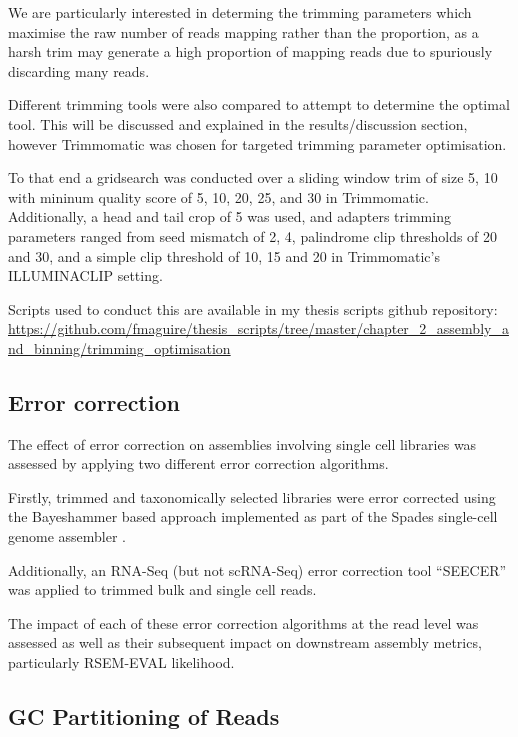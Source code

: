 We are particularly interested in determing the trimming parameters which maximise the raw number of reads mapping rather than
the proportion, as a harsh trim may generate a high proportion of mapping reads due to spuriously discarding 
many reads.  

Different trimming tools were also compared to attempt to determine the optimal tool.
This will be discussed and explained in the results/discussion section, however Trimmomatic \citep{Bolger2014a}
was chosen for targeted trimming parameter optimisation.

To that end a gridsearch was conducted over a sliding window trim of size 5, 10 
with mininum quality score of 5, 10, 20, 25, and 30 in Trimmomatic.  Additionally, 
a head and tail crop of 5 was used, and adapters trimming parameters
ranged from seed mismatch of 2, 4, palindrome clip thresholds of 20 and 30, 
and a simple clip threshold of 10, 15 and 20 in Trimmomatic's ILLUMINACLIP setting.

Scripts used to conduct this are available in my thesis scripts github repository:
\url{https://github.com/fmaguire/thesis_scripts/tree/master/chapter_2_assembly_and_binning/trimming_optimisation}

\subsection{Error correction}

The effect of error correction on assemblies involving single cell libraries was assessed 
by applying two different error correction algorithms. 

Firstly, trimmed and taxonomically selected libraries were error corrected using the
Bayeshammer \citep{Nikolenko2013} based approach implemented as part of the Spades single-cell  
genome assembler \citep{Bankevich2012}.

Additionally, an RNA-Seq (but not scRNA-Seq) error correction tool ``SEECER'' \citep{Le2013} was 
applied to trimmed bulk and single cell reads.

The impact of each of these error correction algorithms at the read level was assessed as well 
as their subsequent impact on downstream assembly metrics, particularly RSEM-EVAL likelihood.


\subsection{GC Partitioning of Reads}

